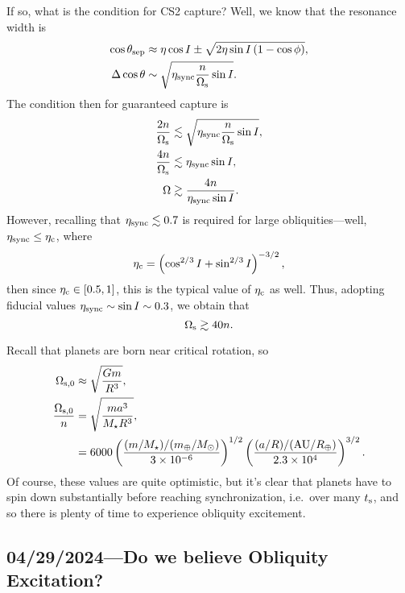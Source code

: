 \documentclass[12pt]{article}
\newcommand*{\scinot}[2]{#1\times10^{#2}}
\newcommand*{\p}[1]{\left(#1\right)}
\begin{document}
If so, what is the condition for CS2 capture? Well, we know that the resonance
width is
\begin{align}
    \cos \theta_{\rm sep}
        &\approx \eta \cos I \pm \sqrt{2\eta \sin I
            \p{1 - \cos \phi}},\\
    \Delta \cos\theta &\sim \sqrt{\eta_{\rm sync}\frac{n}{\Omega_{\rm s}}
        \sin I}.
\end{align}
The condition then for guaranteed capture is
\begin{align}
    \frac{2n}{\Omega_{\rm s}} &\lesssim \sqrt{\eta_{\rm sync}
        \frac{n}{\Omega_{\rm s}}\sin I},\\
    \frac{4n}{\Omega_{\rm s}} &\lesssim \eta_{\rm sync}\sin I,\\
    \Omega &\gtrsim \frac{4n}{\eta_{\rm sync}\sin I}.
\end{align}
However, recalling that $\eta_{\rm sync} \lesssim 0.7$ is required for large
obliquities---well, $\eta_{\rm sync} \leq \eta_{\rm c}$, where
\begin{equation}
    \eta_{\rm c} = \p{\cos^{2/3}I + \sin^{2/3}I}^{-3/2},
\end{equation}
then since $\eta_{\rm c} \in [0.5, 1]$, this is the typical value of $\eta_{\rm
c}$ as well. Thus, adopting fiducial values $\eta_{\rm sync} \sim \sin I \sim
0.3$, we obtain that
\begin{equation}
    \Omega_{\rm s} \gtrsim 40n.
\end{equation}

Recall that planets are born near critical rotation, so
\begin{align}
    \Omega_{\rm s, 0} &\approx \sqrt{\frac{Gm}{R^3}},\\
    \frac{\Omega_{\rm s, 0}}{n}
        &= \sqrt{\frac{ma^3}{M_\star R^3}},\\
        &=
            6000
            \p{\frac{(m/M_\star)/(m_\oplus/M_\odot)}{\scinot{3}{-6}}}^{1/2}
            \p{\frac{(a/R) / (\mathrm{AU} / R_\oplus)}{\scinot{2.3}{4}}}^{3/2}.
\end{align}
Of course, these values are quite optimistic, but it's clear that planets have
to spin down substantially before reaching synchronization, i.e.\ over many
$t_{\rm s}$, and so there is plenty of time to experience obliquity excitement.

\subsection{04/29/2024---Do we believe Obliquity Excitation?}
\end{document}
